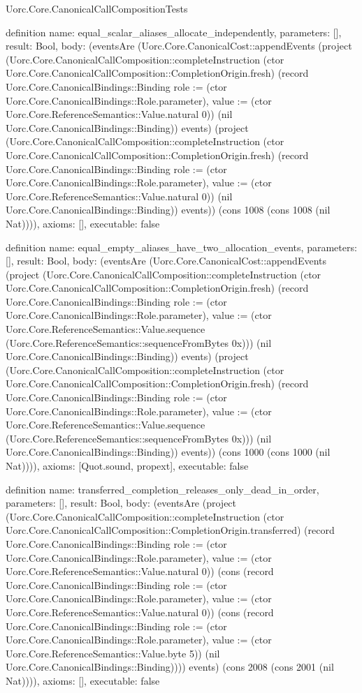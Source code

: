 \begin{lexlean}{Uorc.Core.CanonicalCallCompositionTests}
\begin{semanticmodule}
definition{
  name: equal_scalar_aliases_allocate_independently,
  parameters: [],
  result: Bool,
  body: (eventsAre (Uorc.Core.CanonicalCost::appendEvents (project (Uorc.Core.CanonicalCallComposition::completeInstruction (ctor Uorc.Core.CanonicalCallComposition::CompletionOrigin.fresh) (record Uorc.Core.CanonicalBindings::Binding {role := (ctor Uorc.Core.CanonicalBindings::Role.parameter), value := (ctor Uorc.Core.ReferenceSemantics::Value.natural 0)}) (nil Uorc.Core.CanonicalBindings::Binding)) events) (project (Uorc.Core.CanonicalCallComposition::completeInstruction (ctor Uorc.Core.CanonicalCallComposition::CompletionOrigin.fresh) (record Uorc.Core.CanonicalBindings::Binding {role := (ctor Uorc.Core.CanonicalBindings::Role.parameter), value := (ctor Uorc.Core.ReferenceSemantics::Value.natural 0)}) (nil Uorc.Core.CanonicalBindings::Binding)) events)) (cons 1008 (cons 1008 (nil Nat)))),
  axioms: [],
  executable: false
}

definition{
  name: equal_empty_aliases_have_two_allocation_events,
  parameters: [],
  result: Bool,
  body: (eventsAre (Uorc.Core.CanonicalCost::appendEvents (project (Uorc.Core.CanonicalCallComposition::completeInstruction (ctor Uorc.Core.CanonicalCallComposition::CompletionOrigin.fresh) (record Uorc.Core.CanonicalBindings::Binding {role := (ctor Uorc.Core.CanonicalBindings::Role.parameter), value := (ctor Uorc.Core.ReferenceSemantics::Value.sequence (Uorc.Core.ReferenceSemantics::sequenceFromBytes 0x))}) (nil Uorc.Core.CanonicalBindings::Binding)) events) (project (Uorc.Core.CanonicalCallComposition::completeInstruction (ctor Uorc.Core.CanonicalCallComposition::CompletionOrigin.fresh) (record Uorc.Core.CanonicalBindings::Binding {role := (ctor Uorc.Core.CanonicalBindings::Role.parameter), value := (ctor Uorc.Core.ReferenceSemantics::Value.sequence (Uorc.Core.ReferenceSemantics::sequenceFromBytes 0x))}) (nil Uorc.Core.CanonicalBindings::Binding)) events)) (cons 1000 (cons 1000 (nil Nat)))),
  axioms: [Quot.sound, propext],
  executable: false
}

definition{
  name: transferred_completion_releases_only_dead_in_order,
  parameters: [],
  result: Bool,
  body: (eventsAre (project (Uorc.Core.CanonicalCallComposition::completeInstruction (ctor Uorc.Core.CanonicalCallComposition::CompletionOrigin.transferred) (record Uorc.Core.CanonicalBindings::Binding {role := (ctor Uorc.Core.CanonicalBindings::Role.parameter), value := (ctor Uorc.Core.ReferenceSemantics::Value.natural 0)}) (cons (record Uorc.Core.CanonicalBindings::Binding {role := (ctor Uorc.Core.CanonicalBindings::Role.parameter), value := (ctor Uorc.Core.ReferenceSemantics::Value.natural 0)}) (cons (record Uorc.Core.CanonicalBindings::Binding {role := (ctor Uorc.Core.CanonicalBindings::Role.parameter), value := (ctor Uorc.Core.ReferenceSemantics::Value.byte 5)}) (nil Uorc.Core.CanonicalBindings::Binding)))) events) (cons 2008 (cons 2001 (nil Nat)))),
  axioms: [],
  executable: false
}


\end{semanticmodule}
\end{lexlean}
